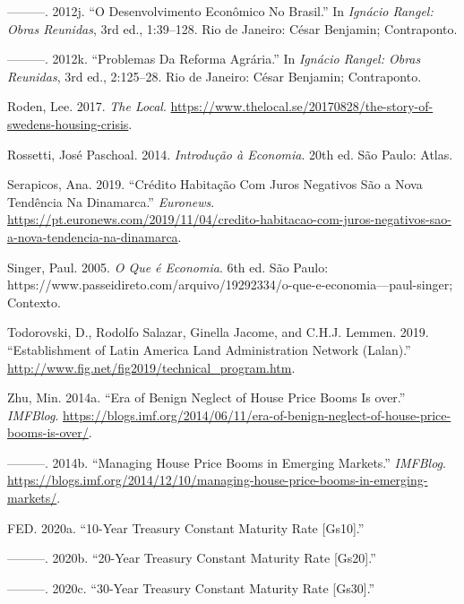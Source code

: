 \documentclass[
	12pt,				%
	oneside,			%
	a4paper,			%
	chapter=TITLE,		%
	section=TITLE,		%
	english,			%
	brazil				%
	]{abntex2}
\DeclareRobustCommand{\firstsecond}[2]{#1}
\begin{document}
\leavevmode\hypertarget{ref-rangel1954}{}%
---------. 2012j. ``O Desenvolvimento Econômico No Brasil.'' In \emph{Ignácio Rangel: Obras Reunidas}, 3rd ed., 1:39--128. Rio de Janeiro: César Benjamin; Contraponto.

\leavevmode\hypertarget{ref-rangel1985}{}%
---------. 2012k. ``Problemas Da Reforma Agrária.'' In \emph{Ignácio Rangel: Obras Reunidas}, 3rd ed., 2:125--28. Rio de Janeiro: César Benjamin; Contraponto.

\leavevmode\hypertarget{ref-suecia}{}%
Roden, Lee. 2017. \emph{The Local}. \url{https://www.thelocal.se/20170828/the-story-of-swedens-housing-crisis}.

\leavevmode\hypertarget{ref-rossetti}{}%
Rossetti, José Paschoal. 2014. \emph{Introdução à Economia}. 20th ed. São Paulo: Atlas.

\leavevmode\hypertarget{ref-serapicos}{}%
Serapicos, Ana. 2019. ``Crédito Habitação Com Juros Negativos São a Nova Tendência Na Dinamarca.'' \emph{Euronews}. \url{https://pt.euronews.com/2019/11/04/credito-habitacao-com-juros-negativos-sao-a-nova-tendencia-na-dinamarca}.

\leavevmode\hypertarget{ref-singer}{}%
Singer, Paul. 2005. \emph{O Que é Economia}. 6th ed. São Paulo: https://www.passeidireto.com/arquivo/19292334/o-que-e-economia---paul-singer; Contexto.

\leavevmode\hypertarget{ref-lalan}{}%
Todorovski, D., Rodolfo Salazar, Ginella Jacome, and C.H.J. Lemmen. 2019. ``Establishment of Latin America Land Administration Network (Lalan).'' \url{http://www.fig.net/fig2019/technical_program.htm}.

\leavevmode\hypertarget{ref-fmiera}{}%
Zhu, Min. 2014a. ``Era of Benign Neglect of House Price Booms Is over.'' \emph{IMFBlog}. \url{https://blogs.imf.org/2014/06/11/era-of-benign-neglect-of-house-price-booms-is-over/}.

\leavevmode\hypertarget{ref-fmiem}{}%
---------. 2014b. ``Managing House Price Booms in Emerging Markets.'' \emph{IMFBlog}. \url{https://blogs.imf.org/2014/12/10/managing-house-price-booms-in-emerging-markets/}.

\leavevmode\hypertarget{ref-fredgs10}{}%
\firstsecond{\gls{FED}}{Board of Governors of the Federal Reserve System (US)}. 2020a. ``10-Year Treasury Constant Maturity Rate {[}Gs10{]}.''

\leavevmode\hypertarget{ref-fredgs20}{}%
---------. 2020b. ``20-Year Treasury Constant Maturity Rate {[}Gs20{]}.''

\leavevmode\hypertarget{ref-fredgs30}{}%
---------. 2020c. ``30-Year Treasury Constant Maturity Rate {[}Gs30{]}.''
\end{document}
